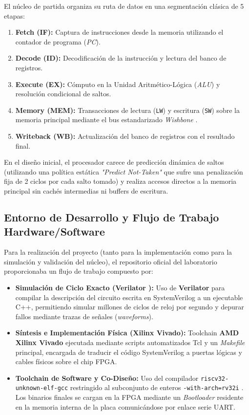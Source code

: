\documentclass[10pt,a4paper]{article}
\begin{document}
El núcleo de partida organiza su ruta de datos en una segmentación clásica de 5 etapas:
\begin{enumerate}
    \item \textbf{Fetch (IF):} Captura de instrucciones desde la memoria utilizando el contador de programa (\textit{PC}).
    \item \textbf{Decode (ID):} Decodificación de la instrucción y lectura del banco de registros.
    \item \textbf{Execute (EX):} Cómputo en la Unidad Aritmético-Lógica (\textit{ALU}) y resolución condicional de saltos.
    \item \textbf{Memory (MEM):} Transacciones de lectura (\texttt{LW}) y escritura (\texttt{SW}) sobre la memoria principal mediante el bus estandarizado 
    \textit{Wishbone} \cite{wishbone_spec}.
    \item \textbf{Writeback (WB):} Actualización del banco de registros con el resultado final.
\end{enumerate}

En el diseño inicial, el procesador carece de predicción dinámica de saltos (utilizando una política estática \textit{"Predict Not-Taken"} que sufre una 
penalización fija de 2 ciclos por cada salto tomado) y realiza accesos directos a la memoria principal sin cachés intermedias ni buffers de escritura.

\subsection{Entorno de Desarrollo y Flujo de Trabajo Hardware/Software}
Para la realización del proyecto (tanto para la implementación como para la simulación y validación del núcleo), el repositorio oficial del laboratorio 
proporcionaba un flujo de trabajo compuesto por:

\begin{itemize}
    \item \textbf{Simulación de Ciclo Exacto (Verilator \cite{verilator}):} Uso de \textbf{Verilator} para compilar la descripción del circuito escrita en SystemVerilog a un 
    ejecutable C++, permitiendo simular millones de ciclos de reloj por segundo y depurar fallos mediante trazas de señales (\textit{waveforms}).
    \item \textbf{Síntesis e Implementación Física (Xilinx Vivado):} Toolchain \textbf{AMD Xilinx Vivado} \cite{vivado} ejecutada mediante scripts automatizados 
    Tcl y un \textit{Makefile} principal, encargada de traducir el código SystemVerilog a puertas lógicas y cables físicos sobre el chip FPGA.
    \item \textbf{Toolchain de Software y Co-Diseño:} Uso del compilador \texttt{riscv32-unknown-elf-gcc} restringido al subconjunto de enteros 
    \texttt{-with-arch=rv32i} \cite{scheipel2024} \cite{riscv_spec}. Los binarios finales se cargan en la FPGA mediante un \textit{Bootloader} residente en la memoria 
    interna de la placa comunicándose por enlace serie UART.
\end{itemize}
\end{document}
